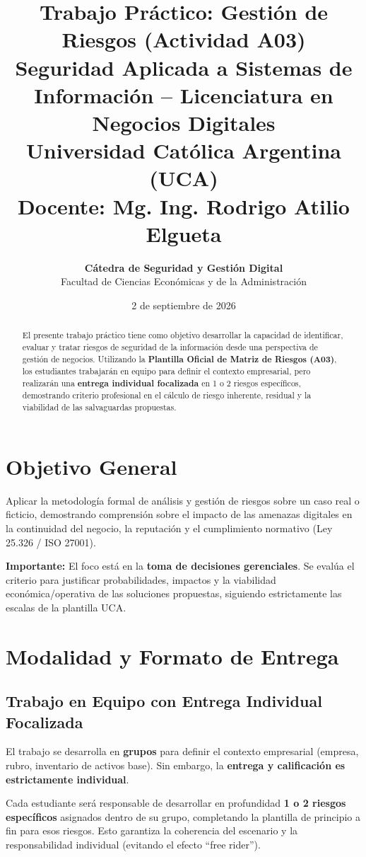 \documentclass[11pt,a4paper]{article}
\title{
    \textbf{\Large Trabajo Práctico: Gestión de Riesgos (Actividad A03)}\\[0.5cm]
    \normalsize Seguridad Aplicada a Sistemas de Información -- Licenciatura en Negocios Digitales\\[0.2cm]
    \normalsize Universidad Católica Argentina (UCA)\\
    \normalsize Docente: Mg. Ing. Rodrigo Atilio Elgueta
}
\author{
    \textbf{Cátedra de Seguridad y Gestión Digital}\\
    Facultad de Ciencias Económicas y de la Administración
}
\date{2 de septiembre de 2026}
\begin{document}
\maketitle
\thispagestyle{empty}

\begin{abstract}
\noindent El presente trabajo práctico tiene como objetivo desarrollar la capacidad de identificar, evaluar y tratar riesgos de seguridad de la información desde una perspectiva de gestión de negocios. Utilizando la \textbf{Plantilla Oficial de Matriz de Riesgos (A03)}, los estudiantes trabajarán en equipo para definir el contexto empresarial, pero realizarán una \textbf{entrega individual focalizada} en 1 o 2 riesgos específicos, demostrando criterio profesional en el cálculo de riesgo inherente, residual y la viabilidad de las salvaguardas propuestas.
\end{abstract}

\tableofcontents
\newpage

\section{Objetivo General}

Aplicar la metodología formal de análisis y gestión de riesgos sobre un caso real o ficticio, demostrando comprensión sobre el impacto de las amenazas digitales en la continuidad del negocio, la reputación y el cumplimiento normativo (Ley 25.326 / ISO 27001).

\textbf{Importante:} El foco está en la \textbf{toma de decisiones gerenciales}. Se evalúa el criterio para justificar probabilidades, impactos y la viabilidad económica/operativa de las soluciones propuestas, siguiendo estrictamente las escalas de la plantilla UCA.

\section{Modalidad y Formato de Entrega}

\subsection{Trabajo en Equipo con Entrega Individual Focalizada}
El trabajo se desarrolla en \textbf{grupos} para definir el contexto empresarial (empresa, rubro, inventario de activos base). Sin embargo, la \textbf{entrega y calificación es estrictamente individual}. 

Cada estudiante será responsable de desarrollar en profundidad \textbf{1 o 2 riesgos específicos} asignados dentro de su grupo, completando la plantilla de principio a fin para esos riesgos. Esto garantiza la coherencia del escenario y la responsabilidad individual (evitando el efecto ``free rider'').
\end{document}
